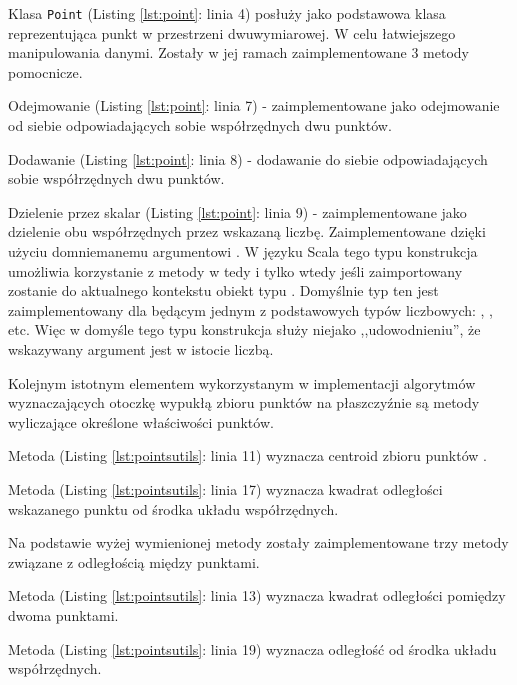    		Klasa \texttt{Point} (Listing \ref{lst:point}: linia 4) posłuży jako podstawowa klasa reprezentująca punkt w przestrzeni dwuwymiarowej. W celu łatwiejszego manipulowania danymi. Zostały w jej ramach zaimplementowane 3 metody pomocnicze.
   		
   		Odejmowanie (Listing \ref{lst:point}: linia 7) - zaimplementowane jako odejmowanie od siebie odpowiadających sobie współrzędnych dwu punktów.
   		
   		Dodawanie (Listing \ref{lst:point}: linia 8) - dodawanie do siebie odpowiadających sobie współrzędnych dwu punktów.
   		
   		Dzielenie przez skalar (Listing \ref{lst:point}: linia 9) - zaimplementowane jako dzielenie obu współrzędnych przez wskazaną liczbę. Zaimplementowane dzięki użyciu domniemanemu argumentowi . W języku Scala tego typu konstrukcja umożliwia korzystanie z metody \scala{/} w tedy i tylko wtedy jeśli zaimportowany zostanie do aktualnego kontekstu obiekt typu . Domyślnie typ ten jest zaimplementowany dla  będącym jednym z podstawowych typów liczbowych: , ,  etc. Więc w domyśle tego typu konstrukcja służy niejako ,,udowodnieniu'', że wskazywany argument jest w istocie liczbą.
   		
   		
   		Kolejnym istotnym elementem wykorzystanym w implementacji algorytmów wyznaczających otoczkę wypukłą zbioru punktów na płaszczyźnie są metody wyliczające określone właściwości punktów.
   		
   		Metoda  (Listing \ref{lst:pointsutils}: linia 11) wyznacza centroid zbioru punktów .
   		
   		Metoda  (Listing \ref{lst:pointsutils}: linia 17) wyznacza kwadrat odległości wskazanego punktu od środka układu współrzędnych.
   		
   		Na podstawie wyżej wymienionej metody zostały zaimplementowane trzy metody związane z odległością między punktami.
   		
   		Metoda  (Listing \ref{lst:pointsutils}: linia 13) wyznacza kwadrat odległości pomiędzy dwoma punktami.
   		
   		Metoda  (Listing \ref{lst:pointsutils}: linia 19) wyznacza odległość od środka układu współrzędnych.
   		
